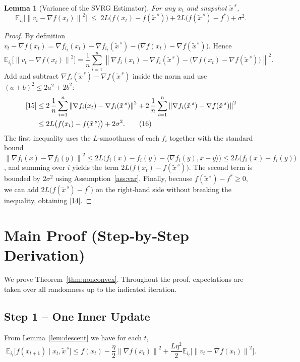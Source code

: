 \documentclass{article}
\newtheorem{lemma}{Lemma}
\newcommand{\EE}{\mathbb{E}}
\newcommand{\norm}[1]{\left\|#1\right\|}
\newcommand{\inner}[2]{\langle #1,#2\rangle}
\newcommand{\grad}{\nabla}
\begin{document}
\begin{lemma}[Variance of the SVRG Estimator]\label{lem:variance}
For any $x_t$ and snapshot $\tilde{x}^{\,s}$,
\[
\EE_{i_t}\!\bigl[\norm{v_t-\grad f(x_t)}^{2}\bigr]
\;\le\;
2L\bigl(f(x_t)-f(\tilde{x}^{\,s})\bigr)
    +2L\bigl(f(\tilde{x}^{\,s})-f^{*}\bigr)
    +\sigma^{2}. 
\tag{14}
\]
\end{lemma}
\begin{proof}
By definition $v_t-\grad f(x_t)=\grad f_{i_t}(x_t)-\grad f_{i_t}(\tilde{x}^{\,s})-\bigl(\grad f(x_t)-\grad f(\tilde{x}^{\,s})\bigr)$. Hence
\[
\EE_{i_t}\!\bigl[\norm{v_t-\grad f(x_t)}^{2}\bigr]
 =\frac{1}{n}\sum_{i=1}^{n}\norm{\grad f_i(x_t)-\grad f_i(\tilde{x}^{\,s})-\bigl(\grad f(x_t)-\grad f(\tilde{x}^{\,s})\bigr)}^{2}.
\tag{15}
\]
Add and subtract $\grad f_i(\tilde{x}^{\,s})-\grad f(\tilde{x}^{\,s})$ inside the norm and use $(a+b)^{2}\le 2a^{2}+2b^{2}$:
\[
\begin{aligned}
\eqref{15}
&\le 2\,\frac{1}{n}\sum_{i=1}^{n}\norm{\grad f_i(x_t)-\grad f_i(\tilde{x}^{\,s})}^{2}
   +2\,\frac{1}{n}\sum_{i=1}^{n}\norm{\grad f_i(\tilde{x}^{\,s})-\grad f(\tilde{x}^{\,s})}^{2}\\
&\le 2L\bigl(f(x_t)-f(\tilde{x}^{\,s})\bigr)
   +2\sigma^{2}. \tag{16}
\end{aligned}
\]
The first inequality uses the $L$‑smoothness of each $f_i$ together with the standard bound
$\norm{\grad f_i(x)-\grad f_i(y)}^{2}\le 2L\bigl(f_i(x)-f_i(y)-\inner{\grad f_i(y)}{x-y}\bigr)\le 2L\bigl(f_i(x)-f_i(y)\bigr)$,
and summing over $i$ yields the term $2L\bigl(f(x_t)-f(\tilde{x}^{\,s})\bigr)$.  
The second term is bounded by $2\sigma^{2}$ using Assumption~\ref{ass:var}.  
Finally, because $f(\tilde{x}^{\,s})-f^{*}\ge0$, we can add $2L\bigl(f(\tilde{x}^{\,s})-f^{*}\bigr)$ on the right‑hand side without breaking the inequality, obtaining \eqref{14}. \qedhere
\end{proof}

\section*{Main Proof (Step‑by‑Step Derivation)}
We prove Theorem~\ref{thm:nonconvex}. Throughout the proof, expectations are taken over all randomness up to the indicated iteration.

\subsection*{Step 1 – One Inner Update}
From Lemma~\ref{lem:descent} we have for each $t$,
\[
\EE_{i_t}\!\bigl[f(x_{t+1})\mid x_t,\tilde{x}^{\,s}\bigr]
\le f(x_t)-\frac{\eta}{2}\norm{\grad f(x_t)}^{2}
   +\frac{L\eta^{2}}{2}\EE_{i_t}\!\bigl[\norm{v_t-\grad f(x_t)}^{2}\bigr].
\tag{17}
\]
\end{document}
